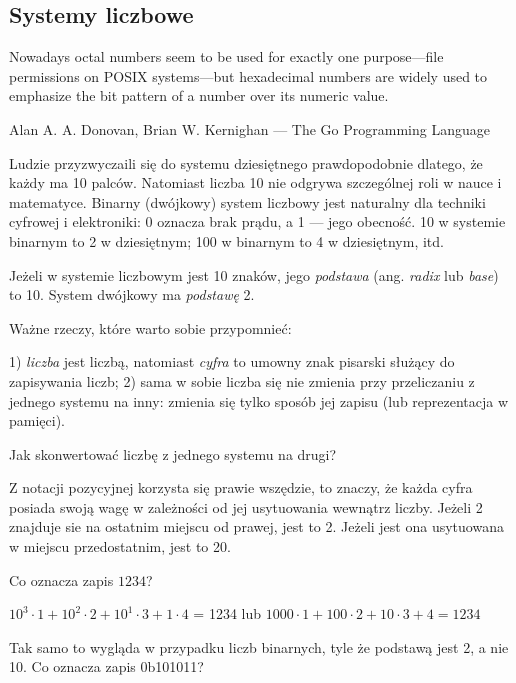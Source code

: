 \subsection{Systemy liczbowe}

\epigraph{Nowadays octal numbers seem to be
used for exactly one purpose---file permissions on POSIX systems---but hexadecimal numbers
are widely used to emphasize the bit pattern of a number over its numeric value.}
{Alan A. A. Donovan, Brian W. Kernighan ---  The Go Programming Language}

Ludzie przyzwyczaili się do systemu dziesiętnego prawdopodobnie dlatego, że każdy ma 10 palców.
Natomiast liczba 10 nie odgrywa szczególnej roli w nauce i matematyce.
Binarny (dwójkowy) system liczbowy jest naturalny dla techniki cyfrowej i elektroniki: 0 oznacza brak prądu, a 1 --- jego obecność.
10 w systemie binarnym to 2 w dziesiętnym; 100 w binarnym to 4 w dziesiętnym, itd.

Jeżeli w systemie liczbowym jest 10 znaków, jego \emph{podstawa} (ang. \emph{radix} lub \emph{base}) to 10.
System dwójkowy ma \emph{podstawę} 2.

Ważne rzeczy, które warto sobie przypomnieć:

1) \emph{liczba} jest liczbą, natomiast \emph{cyfra} to umowny znak pisarski służący do zapisywania liczb;
2) sama w sobie liczba się nie zmienia przy przeliczaniu z jednego systemu na inny: zmienia się tylko sposób jej zapisu (lub reprezentacja w pamięci).

Jak skonwertować liczbę z jednego systemu na drugi?

Z notacji pozycyjnej korzysta się prawie wszędzie, to znaczy, że każda cyfra posiada swoją wagę w zależności od jej usytuowania wewnątrz liczby.
Jeżeli 2 znajduje sie na ostatnim miejscu od prawej, jest to 2.
Jeżeli jest ona usytuowana w miejscu przedostatnim, jest to 20.

Co oznacza zapis $1234$?

$10^3 \cdot 1 + 10^2 \cdot 2 + 10^1 \cdot 3 + 1 \cdot 4$ = 1234 lub
$1000 \cdot 1 + 100 \cdot 2 + 10 \cdot 3 + 4 = 1234$

Tak samo to wygląda w przypadku liczb binarnych, tyle że podstawą jest 2, a nie 10.
Co oznacza zapis 0b101011?

$2^5 \cdot 1 + 2^4 \cdot 0 + 2^3 \cdot 1 + 2^2 \cdot 0 + 2^1 \cdot 1 + 2^0 \cdot 1 = 43$ lub
$32 \cdot 1 + 16 \cdot 0 + 8 \cdot 1 + 4 \cdot 0 + 2 \cdot 1 + 1 = 43$

Notację pozycyjną można przeciwstawić notacji niepozycyjnej, np. rzymskiej.
\footnote{O ewolucji systemów liczbowych przeczytasz w }.
Prawdopodobnie ludzkość przeszła na notację pozycyjną, ponieważ w ten sposób łatwiej jest wykonywać proste operacje (dodawanie, mnożenie, itd.) na papierze, ręcznie.

